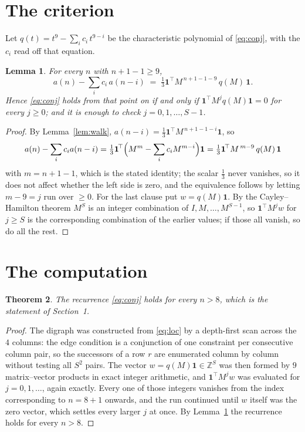 \documentclass[11pt,a4paper]{article}
\theoremstyle{plain}
\newtheorem{theorem}{Theorem}
\newtheorem{lemma}[theorem]{Lemma}
\theoremstyle{definition}
\begin{document}
\section{The criterion}

Let $q(t)=t^{9}-\sum_i c_i\,t^{9-i}$ be the characteristic polynomial of
\eqref{eq:conj}, with the $c_i$ read off that equation.

\begin{lemma}\label{lem:crit}
For every $n$ with $n+1-1\ge9$,
\[
a(n)-\sum_i c_i\,a(n-i)\;=\;\tfrac1{3}\mathbf{1}^{\!\top}M^{\,n+1-1-9}\,q(M)\,\mathbf{1} .
\]
Hence \eqref{eq:conj} holds from that point on if and only if
$\mathbf{1}^{\!\top}M^{j}q(M)\mathbf{1}=0$ for every $j\ge0$; and it is enough to check
$j=0,1,\dots,S-1$.
\end{lemma}

\begin{proof}
By Lemma~\ref{lem:walk}, $a(n-i)=\tfrac1{3}\mathbf{1}^{\!\top}M^{\,n+1-1-i}\mathbf{1}$, so
\[
a(n)-\sum_i c_i a(n-i)
=\tfrac1{3}\mathbf{1}^{\!\top}\Bigl(M^{m}-\sum_i c_i M^{m-i}\Bigr)\mathbf{1}
=\tfrac1{3}\mathbf{1}^{\!\top}M^{\,m-9}\,q(M)\,\mathbf{1}
\]
with $m=n+1-1$, which is the stated identity; the scalar $\tfrac1{3}$ never vanishes, so it does not affect whether the left side is zero, and the equivalence follows by letting
$m-9=j$ run over $\ge0$. For the last clause put $w=q(M)\mathbf{1}$. By the
Cayley--Hamilton theorem $M^{S}$ is an integer combination of $I,M,\dots,M^{S-1}$, so
$\mathbf{1}^{\!\top}M^{j}w$ for $j\ge S$ is the corresponding combination of the earlier
values; if those all vanish, so do all the rest.
\end{proof}

\section{The computation}

\begin{theorem}
The recurrence \eqref{eq:conj} holds for every $n>8$, which is the statement of
Section~1.
\end{theorem}

\begin{proof}
The digraph was constructed from \eqref{eq:loc} by a depth-first scan across the $4$
columns: the edge condition is a conjunction of one constraint per consecutive column
pair, so the successors of a row $r$ are enumerated column by column without testing all
$S^2$ pairs. The vector $w=q(M)\mathbf{1}\in\mathbb{Z}^{S}$ was then formed by $9$
matrix--vector products in exact integer arithmetic, and $\mathbf{1}^{\!\top}M^{j}w$ was
evaluated for $j=0,1,\dots$, again exactly. Every one of those integers vanishes from the
index corresponding to $n=8+1$ onwards, and the run continued until $w$ itself was the
zero vector, which settles every larger $j$ at once. By Lemma~\ref{lem:crit} the recurrence
holds for every $n>8$.
\end{proof}
\end{document}
